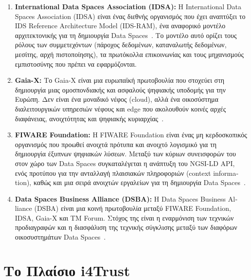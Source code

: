 \begin{enumerate}
    \item \textbf{\textlatin{International Data Spaces Association (IDSA)}:} 
    Η \textlatin{International Data Spaces Association (IDSA)} είναι ένας διεθνής οργανισμός
    που έχει αναπτύξει το \textlatin{IDS Reference Architecture Model (IDS-RAM)}, ένα
    αναφορικό μοντέλο αρχιτεκτονικής για τη δημιουργία \textlatin{Data Spaces}~\cite{idsa2023}.
    Το μοντέλο αυτό ορίζει τους ρόλους των συμμετεχόντων (πάροχος δεδομένων, καταναλωτής
    δεδομένων, μεσίτης, αρχή πιστοποίησης), τα πρωτόκολλα επικοινωνίας και τους μηχανισμούς
    εμπιστοσύνης που πρέπει να εφαρμόζονται.

    \item \textbf{\textlatin{Gaia-X}:} 
    Το \textlatin{Gaia-X} είναι μια ευρωπαϊκή πρωτοβουλία που στοχεύει στη δημιουργία
    μιας ομοσπονδιακής και ασφαλούς ψηφιακής υποδομής για την Ευρώπη. Δεν είναι ένα
    μοναδικό νέφος (\textlatin{cloud}), αλλά ένα οικοσύστημα διαλειτουργικών υπηρεσιών
    νέφους και \textlatin{edge} που ακολουθούν κοινές αρχές διαφάνειας, ανοιχτότητας
    και ψηφιακής κυριαρχίας~\cite{gaiax2023}.

    \item \textbf{\textlatin{FIWARE Foundation}:} 
    Η \textlatin{FIWARE Foundation} είναι ένας μη κερδοσκοπικός οργανισμός που προωθεί
    ανοιχτά πρότυπα και ανοιχτό λογισμικό για τη δημιουργία έξυπνων ψηφιακών λύσεων.
    Μεταξύ των κύριων συνεισφορών του στον χώρο των \textlatin{Data Spaces} συγκαταλέγεται
    η ανάπτυξη του \textlatin{NGSI-LD API}, ενός προτύπου για την ανταλλαγή πλαισιακών
    πληροφοριών (\textlatin{context information}), καθώς και μια σειρά ανοιχτών εργαλείων
    για τη δημιουργία \textlatin{Data Spaces}~\cite{fiware2023}.

    \item \textbf{\textlatin{Data Spaces Business Alliance (DSBA)}:} 
    Η \textlatin{Data Spaces Business Alliance (DSBA)} είναι μια κοινή πρωτοβουλία
    μεταξύ \textlatin{FIWARE Foundation}, \textlatin{IDSA}, \textlatin{Gaia-X} και
    \textlatin{TM Forum}. Στόχος της είναι η εναρμόνιση των τεχνικών προδιαγραφών και
    η διασφάλιση της τεχνικής σύγκλισης μεταξύ των διαφόρων οικοσυστημάτων
    \textlatin{Data Spaces}~\cite{dsba2023}.
\end{enumerate}

\section{Το Πλαίσιο \textlatin{i4Trust}}
\label{sec:i4trust}

